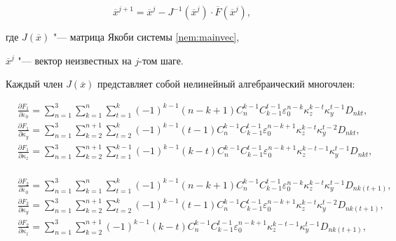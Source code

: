 \begin{equation}\label{nem:solve}

\overline{x}^{j+1}=\overline{x}^j{}-J^{-1}(\overline{x}^j)\cdot\overline{F}(\overline{x}^j),

\end{equation}

где $J(\overline{x})$ "---  матрица Якоби системы \eqref{nem:mainvec}, 

$\overline{x}^j$ "---  вектор неизвестных на $j$-том шаге. 

Каждый член $J(\overline{x})$ представляет собой нелинейный алгебраический многочлен:

\begin{equation}

\begin{aligned}

&\frac{\partial F_1 }{\partial \varepsilon_0}=\sum_{n=1}^3\sum_{k=1}^n\sum_{t=1}^k(-1)^{k-1}(n-k+1)C_n^{k-1}C_{k-1}^{t-1}\varepsilon_0^{n-k} \kappa_z^{k-t}\kappa_y^{t-1}D_{nkt}, \\

&\frac{\partial F_1 }{\partial \kappa_y}=\sum_{n=1}^3\sum_{k=2}^{n+1}\sum_{t=2}^k(-1)^{k-1}(t-1)C_n^{k-1}C_{k-1}^{t-1}\varepsilon_0^{n-k+1} \kappa_z^{k-t}\kappa_y^{t-2}D_{nkt}, \\

&\frac{\partial F_1 }{\partial  \kappa_z}=\sum_{n=1}^3\sum_{k=2}^{n+1}\sum_{t=1}^{k-1}(-1)^{k-1} (k-t)C_n^{k-1}C_{k-1}^{t-1}\varepsilon_0^{n-k+1} \kappa_z^{k-t-1}\kappa_y^{t-1}D_{nkt},~~~~~~~~~~\\

\end{aligned}

\end{equation}



\begin{equation}\label{nem:Iakobi}

\begin{aligned}

&\frac{\partial F_2 }{\partial \varepsilon_0}=\sum_{n=1}^3\sum_{k=1}^n\sum_{t=1}^k(-1)^{k-1}\left(n-k+1\right)C_n^{k-1}C_{k-1}^{t-1}\varepsilon_0^{n-k} \kappa_z^{k-t}\kappa_y^{t-1}D_{nk\left(t+1\right)}, \\

&\frac{\partial F_2 }{\partial \kappa_y}=\sum_{n=1}^3\sum_{k=2}^{n+1}\sum_{t=2}^k(-1)^{k-1}\left(t-1\right)C_n^{k-1}C_{k-1}^{t-1}\varepsilon_0^{n-k+1} \kappa_z^{k-t}\kappa_y^{t-2}D_{nk\left(t+1\right)}, \\

&\frac{\partial F_2 }{\partial \kappa_z}=\sum_{n=1}^3\sum_{k=2}^{n+1}(-1)^{k-1}\left(k-t\right)C_n^{k-1}C_{k-1}^{t-1}\varepsilon_0^{n-k+1} \kappa_z^{k-t-1}\kappa_y^{t-1}D_{nk\left(t+1\right)},\\

\end{aligned}

\end{equation}

